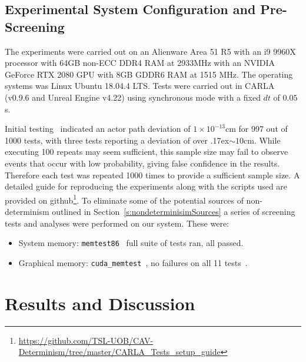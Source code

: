 \subsection{Experimental System Configuration and Pre-Screening}\label{s:screening}
The experiments were carried out on an Alienware Area 51 R5 with an i9 9960X processor with 64GB non-ECC DDR4 RAM at 2933MHz with an NVIDIA GeForce RTX 2080 GPU with 8GB GDDR6 RAM at 1515 MHz. The operating systems was Linux Ubuntu 18.04.4 LTS. Tests were carried out in CARLA (v0.9.6 and Unreal Engine v4.22) using synchronous mode with a fixed $dt$ of $0.05$s. 

Initial testing~\cite{TSLUnrealEngineTesting} indicated an actor path deviation of $1\times10^{-13}$cm for 997 out of 1000 tests, with three tests reporting a deviation of over {\raise.17ex\hbox{$\scriptstyle\sim$}}$10$cm. While executing 100 repeats may seem sufficient, this sample size may fail to observe events that occur with low probability, giving false confidence in the results. Therefore each test was repeated 1000 times to provide a sufficient sample size. A detailed guide for reproducing the experiments along with the scripts used are provided on github\footnote{\url{https://github.com/TSL-UOB/CAV-Determinism/tree/master/CARLA_Tests_setup_guide}}. To eliminate some of the potential sources of non-determinism outlined in Section~\ref{s:nondeterminisimSources} a series of screening tests and analyses were performed on our system. These were:

\begin{itemize}[leftmargin=*]
    \item System memory: \texttt{memtest86}~\cite{MemTest86} full suite of tests ran, all passed.
    \item Graphical memory: \texttt{cuda\_memtest}~\cite{cuda_memtest}, no failures on all 11 tests~\cite{shi2009testing}.
\end{itemize}

\section{Results and Discussion}\label{s:FinalResultsSection}

